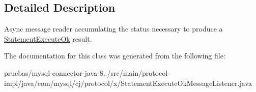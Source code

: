 \subsection{Detailed Description}
Async message reader accumulating the status necessary to produce a \mbox{\hyperlink{classcom_1_1mysql_1_1cj_1_1protocol_1_1x_1_1_statement_execute_ok}{Statement\+Execute\+Ok}} result. 

The documentation for this class was generated from the following file\+:\begin{DoxyCompactItemize}
\item 
pruebas/mysql-\/connector-\/java-\/8../src/main/protocol-\/impl/java/com/mysql/cj/protocol/x/Statement\+Execute\+Ok\+Message\+Listener.\+java\end{DoxyCompactItemize}

